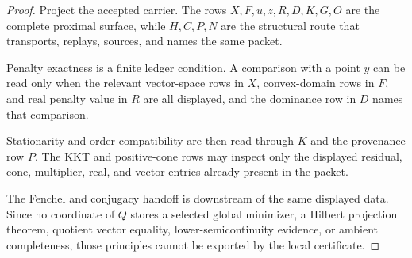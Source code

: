 \begin{proof}
Project the accepted carrier. The rows $X,F,u,z,R,D,K,G,O$ are the complete proximal surface, while $H,C,P,N$ are the structural route that transports, replays, sources, and names the same packet.

Penalty exactness is a finite ledger condition. A comparison with a point $y$ can be read only when the relevant vector-space rows in $X$, convex-domain rows in $F$, and real penalty value in $R$ are all displayed, and the dominance row in $D$ names that comparison.

Stationarity and order compatibility are then read through $K$ and the provenance row $P$. The KKT and positive-cone rows may inspect only the displayed residual, cone, multiplier, real, and vector entries already present in the packet.

The Fenchel and conjugacy handoff is downstream of the same displayed data. Since no coordinate of $Q$ stores a selected global minimizer, a Hilbert projection theorem, quotient vector equality, lower-semicontinuity evidence, or ambient completeness, those principles cannot be exported by the local certificate.
\end{proof}

